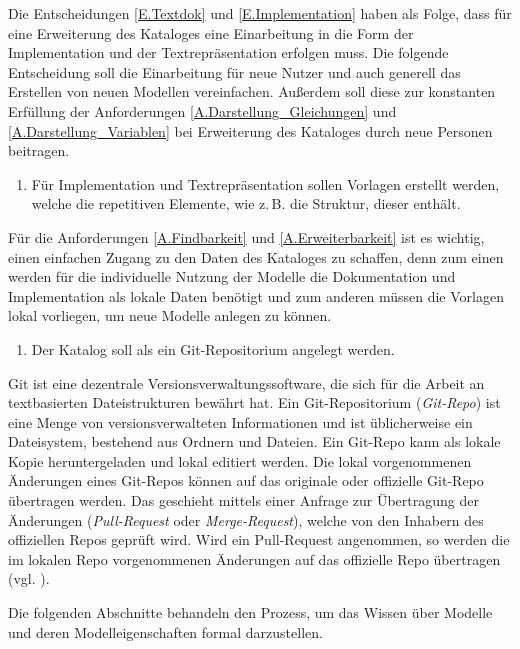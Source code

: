 Die Entscheidungen \ref{E.Textdok} und \ref{E.Implementation} haben als Folge, dass für eine Erweiterung des Kataloges eine Einarbeitung in die Form der Implementation und der Textrepräsentation erfolgen muss. Die folgende Entscheidung soll die Einarbeitung für neue Nutzer und auch generell das Erstellen von neuen Modellen vereinfachen. Außerdem soll diese zur konstanten Erfüllung der Anforderungen \ref{A.Darstellung_Gleichungen} und \ref{A.Darstellung_Variablen} bei Erweiterung des Kataloges durch neue Personen beitragen.
\begin{enumerate}[resume*]
	\item \label{E.Vorlagen}Für Implementation und Textrepräsentation sollen Vorlagen erstellt werden, welche die repetitiven Elemente, wie z.\,B. die Struktur, dieser enthält. 
\end{enumerate}

Für die Anforderungen \ref{A.Findbarkeit} und \ref{A.Erweiterbarkeit} ist es wichtig, einen einfachen Zugang zu den Daten des Kataloges zu schaffen, denn zum einen werden für die individuelle Nutzung der Modelle die Dokumentation und Implementation als lokale Daten benötigt und zum anderen müssen die Vorlagen lokal vorliegen, um neue Modelle anlegen zu können.
\begin{enumerate}[resume*]
	\item \label{E.Git}Der Katalog soll als ein Git-Repositorium angelegt werden.
\end{enumerate}
Git ist eine dezentrale Versionsverwaltungssoftware, die sich für die Arbeit an textbasierten Dateistrukturen bewährt hat. Ein Git-Repositorium (\textit{Git-Repo}) ist eine Menge von versionsverwalteten Informationen und ist üblicherweise ein Dateisystem, bestehend aus Ordnern und Dateien. Ein Git-Repo kann als lokale Kopie heruntergeladen und lokal editiert werden. Die lokal vorgenommenen Änderungen eines Git-Repos können auf das originale oder offizielle Git-Repo übertragen werden. Das geschieht mittels einer Anfrage zur Übertragung der Änderungen (\textit{Pull-Request} oder \textit{Merge-Request}), welche von den Inhabern des offiziellen Repos geprüft wird. Wird ein Pull-Request angenommen, so werden die im lokalen Repo vorgenommenen Änderungen auf das offizielle Repo übertragen (vgl. \cite[Abschnitt 2.1]{KNHE20a}).

Die folgenden Abschnitte behandeln den Prozess, um das Wissen über Modelle und deren Modelleigenschaften formal darzustellen.
